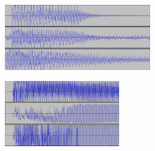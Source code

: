 \begin{figure}[b]
\centering
\begin{minipage}[b]{0.48\columnwidth}
\centering
\includegraphics[height=80pt]{figure/88_88/f1s.png}
\label{fig:88_88_lag1}
\end{minipage}
\begin{minipage}[b]{0.48\columnwidth}
\centering
\includegraphics[height=80pt]{figure/88_88_det/a7_0_0030.png}
\label{fig:88_88_lag2}
\end{minipage}
\caption[課題：データセットの不安定さ]{}
\end{figure}